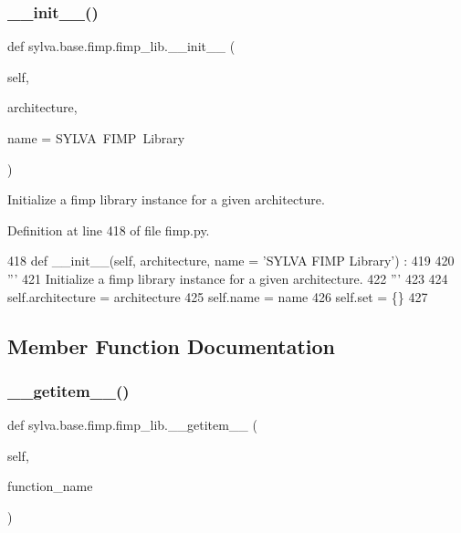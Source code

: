 \subsubsection{\texorpdfstring{\+\_\+\+\_\+init\+\_\+\+\_\+()}{\_\_init\_\_()}}
{\footnotesize\ttfamily def sylva.\+base.\+fimp.\+fimp\+\_\+lib.\+\_\+\+\_\+init\+\_\+\+\_\+ (\begin{DoxyParamCaption}\item[{}]{self,  }\item[{}]{architecture,  }\item[{}]{name = {\ttfamily \textquotesingle{}SYLVA~FIMP~Library\textquotesingle{}} }\end{DoxyParamCaption})}

\begin{DoxyVerb}  Initialize a fimp library instance for a given architecture.
\end{DoxyVerb}
 

Definition at line 418 of file fimp.\+py.


\begin{DoxyCode}
418     \textcolor{keyword}{def }\_\_init\_\_(self, architecture, name = 'SYLVA FIMP Library') :
419 
420       \textcolor{stringliteral}{'''}
421 \textcolor{stringliteral}{        Initialize a fimp library instance for a given architecture.}
422 \textcolor{stringliteral}{      '''}
423 
424       self.architecture = architecture
425       self.name = name
426       self.set = \{\}
427 
\end{DoxyCode}


\subsection{Member Function Documentation}
\mbox{\label{classsylva_1_1base_1_1fimp_1_1fimp__lib_a152519a744a90e55da513de86e390ebb}} 
\subsubsection{\texorpdfstring{\+\_\+\+\_\+getitem\+\_\+\+\_\+()}{\_\_getitem\_\_()}}
{\footnotesize\ttfamily def sylva.\+base.\+fimp.\+fimp\+\_\+lib.\+\_\+\+\_\+getitem\+\_\+\+\_\+ (\begin{DoxyParamCaption}\item[{}]{self,  }\item[{}]{function\+\_\+name }\end{DoxyParamCaption})}




